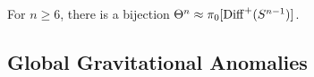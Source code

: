\begin{theorem}
  For $n\geq 6$, there is a bijection $\Theta^n \approx \pi_0[\operatorname{Diff}^+(S^{n-1})]$.
\end{theorem}

\subsection{Global Gravitational Anomalies}

\cite{witten1985anomalies}
